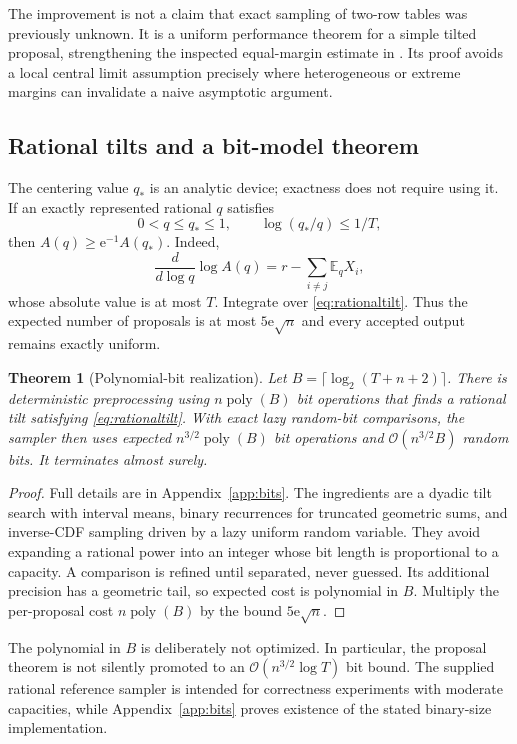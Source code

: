 \documentclass[11pt,a4paper]{article}
\newtheorem{theorem}{Theorem}[section]
\theoremstyle{definition}
\newcommand{\E}{\mathbb E}
\newcommand{\ee}{\mathrm e}
\newcommand{\BigO}{\mathcal O}
\begin{document}
The improvement is not a claim that exact sampling of two-row tables was previously unknown. It is a uniform performance theorem for a simple tilted proposal, strengthening the inspected equal-margin estimate in \cite{dz}. Its proof avoids a local central limit assumption precisely where heterogeneous or extreme margins can invalidate a naive asymptotic argument.

\subsection{Rational tilts and a bit-model theorem}\label{sec:tablebits}

The centering value $q_*$ is an analytic device; exactness does not require using it. If an exactly represented rational $q$ satisfies
\begin{equation}\label{eq:rationaltilt}
 0<q\le q_*\le1,\qquad \log(q_*/q)\le1/T,
\end{equation}
then $A(q)\ge\ee^{-1}A(q_*)$. Indeed,
\[
 \frac{d}{d\log q}\log A(q)=r-\sum_{i\ne j}\E_qX_i,
\]
whose absolute value is at most $T$. Integrate over \eqref{eq:rationaltilt}. Thus the expected number of proposals is at most $5\ee\sqrt n$ and every accepted output remains exactly uniform.

\begin{theorem}[Polynomial-bit realization]\label{thm:tablebits}
Let $B=\lceil\log_2(T+n+2)\rceil$. There is deterministic preprocessing using $n\operatorname{poly}(B)$ bit operations that finds a rational tilt satisfying \eqref{eq:rationaltilt}. With exact lazy random-bit comparisons, the sampler then uses expected
$n^{3/2}\operatorname{poly}(B)$ bit operations and $\BigO(n^{3/2}B)$ random bits. It terminates almost surely.
\end{theorem}
\begin{proof}
Full details are in Appendix~\ref{app:bits}. The ingredients are a dyadic tilt search with interval means, binary recurrences for truncated geometric sums, and inverse-CDF sampling driven by a lazy uniform random variable. They avoid expanding a rational power into an integer whose bit length is proportional to a capacity. A comparison is refined until separated, never guessed. Its additional precision has a geometric tail, so expected cost is polynomial in $B$. Multiply the per-proposal cost $n\operatorname{poly}(B)$ by the bound $5\ee\sqrt n$.
\end{proof}

The polynomial in $B$ is deliberately not optimized. In particular, the proposal theorem is not silently promoted to an $\BigO(n^{3/2}\log T)$ bit bound. The supplied rational reference sampler is intended for correctness experiments with moderate capacities, while Appendix~\ref{app:bits} proves existence of the stated binary-size implementation.
\end{document}

